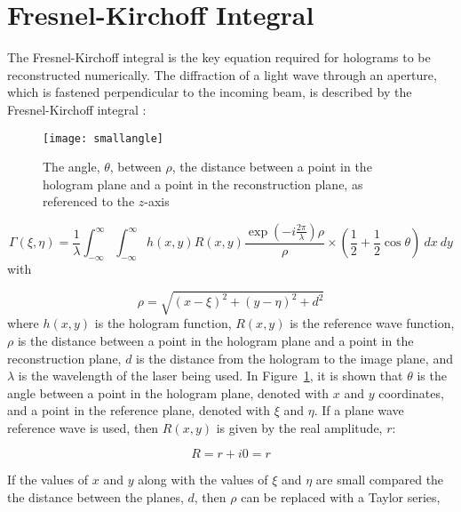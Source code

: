 \section{Fresnel-Kirchoff Integral}

The Fresnel-Kirchoff integral is the key equation required for holograms
to be reconstructed numerically.
The diffraction of a light wave through an aperture, which is fastened perpendicular
to the incoming beam, is described by the Fresnel-Kirchoff integral
\cite{schnars_digital_2002}:

    \begin{figure}
    \begin{center}
        \texttt{[image: smallangle]}
    \end{center}
    \caption{The angle, $\theta$, between $\rho$, the distance between a point
    in the hologram plane and a point in the reconstruction plane, as
    referenced to the $z$-axis}
    \label{fig:smallangle}
    \end{figure}

\begin{equation}
    \Gamma(\xi,\eta) =
    \frac{1}{\lambda}\int_{-\infty}^{\infty}\int_{-\infty}^{\infty}h(x,y)R(x,y)\frac{\exp\left(
        -i\frac{2\pi}{\lambda} \right)\rho}{\rho}\times \left(
        \frac{1}{2}+\frac{1}{2}\cos\theta \right)~dx~dy
        \label{fresnel-kirchoff}
    \end{equation}
    with

    \begin{equation}
        \rho = \sqrt{(x-\xi)^{2}+(y-\eta)^{2}+d^{2}}
    \end{equation}
    where $h(x,y)$ is the hologram function, $R(x,y)$ is the reference wave
    function, $\rho$ is the distance between a point in the hologram plane and
    a point in the reconstruction plane, $d$ is the distance from the hologram
    to the image plane, and $\lambda$ is the wavelength of the laser being used. 
    In Figure~\ref{fig:smallangle}, it is shown that $\theta$ is the angle
    between a point in the hologram plane, denoted with $x$ and $y$
    coordinates, and a point in the reference plane, denoted with $\xi$ and
    $\eta$.
    If a plane wave reference wave is used,
    then $R(x,y)$ is given by the real amplitude, $r$:

    \begin{equation}
        R = r+ i0 = r
    \end{equation}

    If the values of $x$ and $y$ along with the values of $\xi$ and $\eta$ are
    small compared the the distance between the planes, $d$, then $\rho$ can be
    replaced with a Taylor series,

